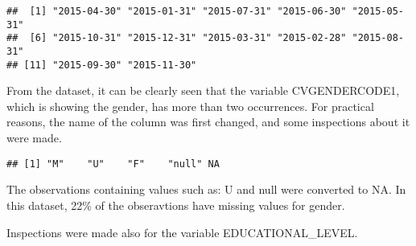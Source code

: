 \documentclass[]{article}
\newenvironment{Shaded}{\begin{snugshade}}{\end{snugshade}}
\newcommand{\KeywordTok}[1]{\textcolor[rgb]{0.13,0.29,0.53}{\textbf{#1}}}
\newcommand{\StringTok}[1]{\textcolor[rgb]{0.31,0.60,0.02}{#1}}
\newcommand{\OtherTok}[1]{\textcolor[rgb]{0.56,0.35,0.01}{#1}}
\newcommand{\OperatorTok}[1]{\textcolor[rgb]{0.81,0.36,0.00}{\textbf{#1}}}
\newcommand{\NormalTok}[1]{#1}
\begin{document}
\begin{verbatim}
##  [1] "2015-04-30" "2015-01-31" "2015-07-31" "2015-06-30" "2015-05-31"
##  [6] "2015-10-31" "2015-12-31" "2015-03-31" "2015-02-28" "2015-08-31"
## [11] "2015-09-30" "2015-11-30"
\end{verbatim}

From the dataset, it can be clearly seen that the variable
CVGENDERCODE1, which is showing the gender, has more than two
occurrences. For practical reasons, the name of the column was first
changed, and some inspections about it were made.

\begin{Shaded}
\end{Shaded}

\begin{verbatim}
## [1] "M"    "U"    "F"    "null" NA
\end{verbatim}

The observations containing values such as: U and null were converted to
NA. In this dataset, 22\% of the obseravtions have missing values for
gender.

\begin{Shaded}
\end{Shaded}

Inspections were made also for the variable EDUCATIONAL\_LEVEL.

\begin{Shaded}
\end{Shaded}
\end{document}
